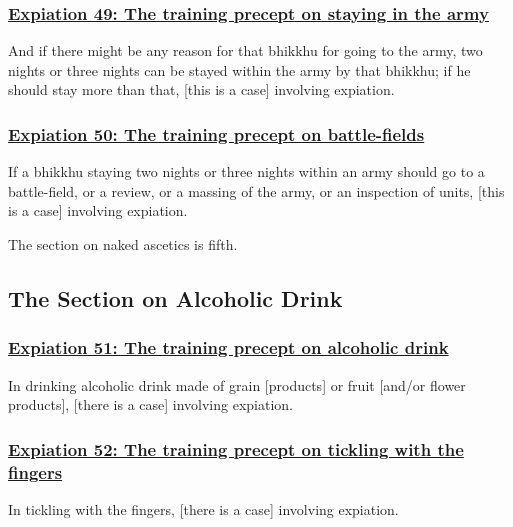 \subsubsection*{\hyperref[pac49]{Expiation 49: The training precept on staying in the army}}
\label{exp49}
And if there might be any reason for that bhikkhu for going to the army, two nights or three nights can be stayed within the army by that bhikkhu; if he should stay more than that, [this is a case] involving expiation.



\subsubsection*{\hyperref[pac50]{Expiation 50: The training precept on battle-fields}}
\label{exp50}
If a bhikkhu staying two nights or three nights within an army should go to a battle-field, or a review, or a massing of the army, or an inspection of units, [this is a case] involving expiation.

The section on naked ascetics is fifth.



\setsubsecheadstyle{\subsectionFmt}
\subsection{The Section on Alcoholic Drink}

\subsubsection*{\hyperref[pac51]{Expiation 51: The training precept on alcoholic drink}}
\label{exp51}
In drinking alcoholic drink made of grain [products] or fruit [and/or flower products], [there is a case] involving expiation.



\subsubsection*{\hyperref[pac52]{Expiation 52: The training precept on tickling with the fingers}}
\label{exp52}
In tickling with the fingers, [there is a case] involving expiation.




